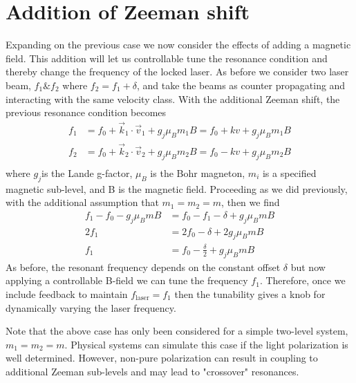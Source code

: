 \section{Addition of Zeeman shift}
Expanding on the previous case we now consider the effects of adding a magnetic field.
This addition will let us controllable tune the resonance condition and thereby change the frequency of the locked laser.
As before we consider two laser beam, $f_1 \& f_2$ where $f_2 = f_1 + \delta$, and take the beams as counter propagating and interacting with the same velocity class.
With the additional Zeeman shift, the previous resonance condition becomes
\begin{equation}
\begin{split}
	f_1 &= f_0 +  \vec{k}_1 \cdot \vec{v}_1 + g_j \mu_B m_1 B = f_0 + k v + g_j \mu_B m_1 B \\
	f_2 &= f_0 +  \vec{k}_2 \cdot \vec{v}_2 + g_j \mu_B m_2 B = f_0 - k v + g_j \mu_B m_2 B \\
\end{split}
\end{equation}
where $g_j$is the Lande g-factor, $\mu_B$ is the Bohr magneton, $m_i$ is a specified magnetic sub-level, and B is the magnetic field.
Proceeding as we did previously, with the additional assumption that $m_1=m_2=m$, then we find
\begin{equation}
\begin{split}
	f_1 - f_0 - g_j \mu_B mB &= f_0 - f_1 - \delta + g_j \mu_B mB \\
		 2f_1 &= 2f_0 - \delta + 2 g_j \mu_B mB \\
  f_1  &=   f_0 - \frac{\delta}{2} + g_j \mu_B mB
\end{split}
\end{equation}
As before, the resonant frequency depends on the constant offset $\delta$ but now applying a controllable B-field we can tune the frequency $f_1$.
Therefore, once we include feedback to maintain $f_{\text{laser}}=f_1$ then the tunability gives a knob for dynamically varying the laser frequency.

Note that the above case has only been considered for a simple two-level system, $m_1=m_2=m$.
Physical systems can simulate this case if the light polarization is well determined.
However, non-pure polarization can result in coupling to additional Zeeman sub-levels and may lead to "crossover" resonances.
